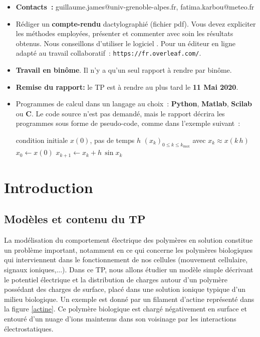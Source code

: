 \documentclass[a4paper,10pt]{article}
\begin{document}
\begin{itemize}
\item 
\textbf{Contacts~:}
guillaume.james@univ-grenoble-alpes.fr,
fatima.karbou@meteo.fr
\item R\'ediger un \textbf{compte-rendu} dactylographi\'e (fichier pdf).
Vous devez expliciter les m\'ethodes employ\'ees, pr\'esenter et commenter avec soin les r\'esultats obtenus.
Nous conseillons d'utiliser le logiciel .
Pour un \'editeur en ligne adapt\'e au travail collaboratif~:
\verb+https://fr.overleaf.com/+.
\item \textbf{Travail en bin\^ome}. Il n'y a qu'un seul rapport \`a rendre par bin\^ome.
\item \textbf{Remise du rapport:} le TP est \`a rendre au plus tard le \textbf{11 Mai 2020}.
\item Programmes de calcul dans un langage au choix~: \textbf{Python}, \textbf{Matlab}, \textbf{Scilab} ou \textbf{C}. 
Le code source n'est pas demand\'e, mais le rapport d\'ecrira les programmes 
sous forme de pseudo-code, comme dans l'exemple suivant~:
\begin{algorithm}[h]
\caption{\label{cnl}Sch\'ema d'Euler pour $x^\prime = \sin{x}$}
\begin{algorithmic}
\REQUIRE condition initiale $x(0)$, pas de temps $h$
\ENSURE $(x_k)_{0\leq k \leq k_{\mathrm{max}}}$ avec $x_k \approx x (k\, h)$
\STATE $x_0 \leftarrow x(0)$
\STATE $x_{k+1} \leftarrow x_{k} + h\, \sin{x_k}$
\ENDFOR
\end{algorithmic}
\end{algorithm}
\end{itemize}

\newpage
\section{Introduction}

\subsection{Mod\`eles et contenu du TP}
La mod\'elisation du comportement \'electrique des polym\`eres en solution constitue un probl\`eme important, notamment
en ce qui concerne les polym\`eres biologiques qui interviennent dans le fonctionnement de nos cellules
(mouvement cellulaire, signaux ioniques,...). 
Dans ce TP, nous allons \'etudier un mod\`ele simple d\'ecrivant le potentiel \'electrique et la distribution de charges
autour d'un polym\`ere poss\'edant des charges de surface, plac\'e dans une solution ionique typique d'un milieu biologique.
Un exemple est donn\'e par un filament d'actine repr\'esent\'e dans la figure \ref{actine}. Ce polym\`ere biologique
est charg\'e n\'egativement en surface et entour\'e d'un nuage d'ions maintenus dans son voisinage
par les interactions \'electrostatiques.
\end{document}
